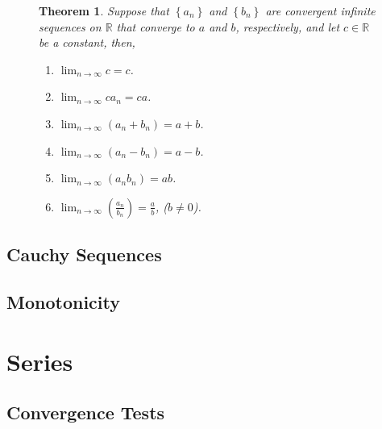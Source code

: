 \documentclass{article}
\newcommand*{\R}{\mathbb{R}}
\theoremstyle{plain}
\newtheorem{theorem}{Theorem}[section]
\numberwithin{theorem}{subsection}
\theoremstyle{definition}
\numberwithin{definition}{subsection}
\theoremstyle{remark}
\numberwithin{note}{section}
\begin{document}
\begin{figure}[H]
	\begin{mdframed}[style=exampledefault,frametitle={Limits of Sequences}]
		\begin{theorem}
			Suppose that $\left\{a_n\right\}$ and $\left\{b_n\right\}$ are convergent infinite sequences on $\R$ that converge to $a$ and $b$, respectively, and let $c\in\R$ be a constant, then,
			\begin{enumerate}[label=\normalfont\alph*)]
				\item $\lim_{n\to\infty}c=c$.
				\item $\lim_{n\to\infty}ca_n=ca$.
				\item $\lim_{n\to\infty}\left( a_n + b_n \right)=a+b$.
				\item $\lim_{n\to\infty}\left( a_n - b_n \right)=a-b$.
				\item $\lim_{n\to\infty}\left( a_nb_n \right)=ab$.
				\item $\lim_{n\to\infty}\left( \frac{a_n}{b_n} \right)=\frac{a}{b}$, ($b\neq 0$).
			\end{enumerate}
		\end{theorem}
	\end{mdframed}
\end{figure}
%
\subsection{Cauchy Sequences}
\subsection{Monotonicity}
\section{Series}
%
\subsection{Convergence Tests}

%
\end{document}
